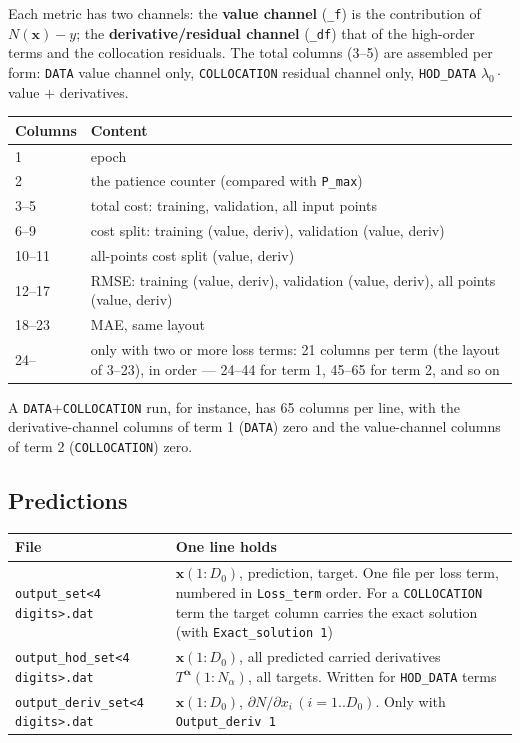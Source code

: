 \documentclass[10pt,a4paper]{article}
\newcommand{\code}[1]{\texttt{#1}}
\newcommand{\mi}[1]{\boldsymbol{#1}}
\begin{document}
Each metric has two channels: the \textbf{value channel} (\code{\_f})
is the contribution of $N(\mi{x})-y$; the \textbf{derivative/residual
channel} (\code{\_df}) that of the high-order terms and the
collocation residuals. The total columns (3--5) are assembled per
form: \code{DATA} value channel only, \code{COLLOCATION} residual
channel only, \code{HOD\_DATA} $\lambda_0\cdot$value $+$
derivatives.

\begin{longtable}{@{}p{}p{}@{}}
\toprule
Columns & Content \\
\midrule
\endhead
1 & epoch\\
2 & the patience counter (compared with \code{P\_max})\\
3--5 & total cost: training, validation, all input points\\
6--9 & cost split: training (value, deriv), validation (value, deriv)\\
10--11 & all-points cost split (value, deriv)\\
12--17 & RMSE: training (value, deriv), validation (value, deriv), all points (value, deriv)\\
18--23 & MAE, same layout\\
24-- & only with two or more loss terms: 21 columns per term (the layout of 3--23), in order --- 24--44 for term 1, 45--65 for term 2, and so on\\
\bottomrule
\end{longtable}

A \code{DATA}+\code{COLLOCATION} run, for instance, has 65 columns
per line, with the derivative-channel columns of term 1 (\code{DATA})
zero and the value-channel columns of term 2 (\code{COLLOCATION})
zero.

\subsection{Predictions}

\begin{longtable}{@{}p{}p{}@{}}
\toprule
File & One line holds \\
\midrule
\endhead
\code{output\_set<4 digits>.dat} & $\mi{x}(1{:}D_0)$, prediction, target. One file per loss term, numbered in \code{Loss\_term} order. For a \code{COLLOCATION} term the target column carries the exact solution (with \code{Exact\_solution 1})\\
\code{output\_hod\_set<4 digits>.dat} & $\mi{x}(1{:}D_0)$, all predicted carried derivatives $T^{\mi\alpha}(1{:}N_\alpha)$, all targets. Written for \code{HOD\_DATA} terms\\
\code{output\_deriv\_set<4 digits>.dat} & $\mi{x}(1{:}D_0)$, $\partial N/\partial x_i\,(i=1..D_0)$. Only with \code{Output\_deriv 1}\\
\bottomrule
\end{longtable}
\end{document}
